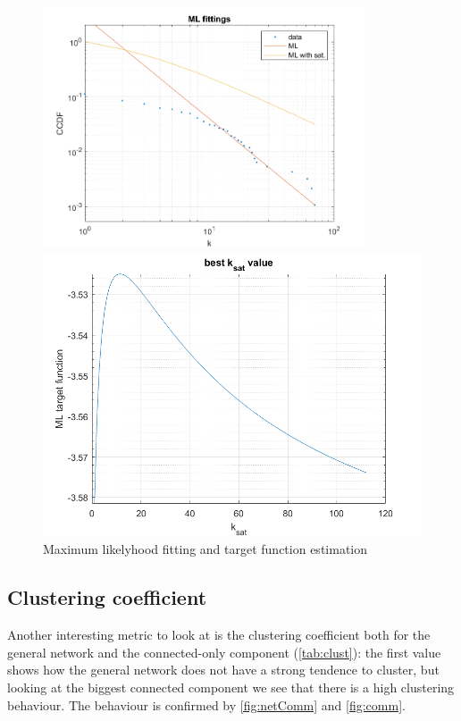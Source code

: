 \documentclass[12pt,a4paper]{article}
\begin{document}
\begin{figure}
\centering
\begin{minipage}[c]{0.47\textwidth}
  \includegraphics[width = 0.85\textwidth]{img/MLfitting}
\end{minipage}
\begin{minipage}[c]{0.47\textwidth}
  \includegraphics[width = \textwidth]{img/MLtargetFunction}
\end{minipage}
\caption{Maximum likelyhood fitting and target function estimation}
\label{fig:ML}
\end{figure}

\subsection*{Clustering coefficient}
Another interesting metric to look at is the clustering coefficient both for the general network and the connected-only component (\autoref{tab:clust}): the first value shows how the general network does not have a strong tendence to cluster, but looking at the biggest connected component we see that there is a high clustering behaviour. The behaviour is confirmed by \autoref{fig:netComm} and \autoref{fig:comm}.
\end{document}
